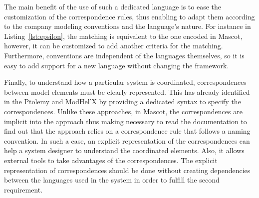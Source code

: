 The main benefit of the use of such a dedicated language is to ease the customization of the correspondence rules, thus enabling to adapt them according to the company modeling conventions and the language's nature. For instance in Listing~\ref{lst:epsilon}, the matching is equivalent to the one encoded in Mascot, however, it can be customized to add another criteria for the matching. Furthermore, conventions are independent of the languages themselves, so it is easy to add support for a new language without changing the framework.


Finally, to understand how a particular system is coordinated, correspondences between model elements must be clearly represented. This has already identified in the Ptolemy and ModHel'X by providing a dedicated syntax to specify the correspondences. Unlike these approaches, in Mascot, the correspondences are implicit into the approach thus making necessary to read the documentation to find out that the approach relies on a correspondence rule that follows a naming convention. In such a case, an explicit representation of the correspondences can help a system designer to understand the coordinated elements. Also, it allows external tools to take advantages of the correspondences. The explicit representation of correspondences should be done without creating dependencies between the languages used in the system in order to fulfill the second requirement.%
	
	
	
	
	
